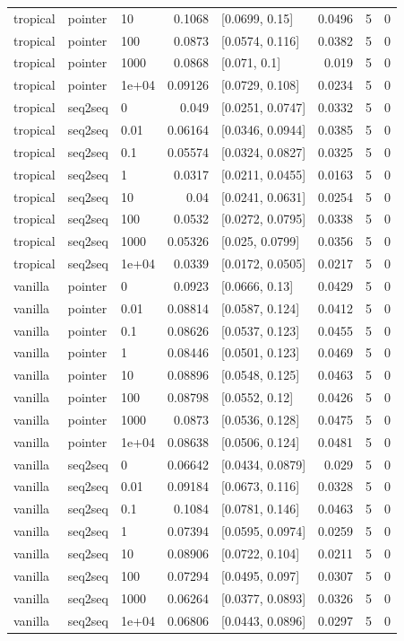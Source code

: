 \documentclass[10pt]{article}
\begin{document}
{\begin{longtable}{lllrlrrr}
tropical & pointer & 10 & 0.1068 & [0.0699, 0.15] & 0.0496 & 5 & 0\\
tropical & pointer & 100 & 0.0873 & [0.0574, 0.116] & 0.0382 & 5 & 0\\
tropical & pointer & 1000 & 0.0868 & [0.071, 0.1] & 0.019 & 5 & 0\\
tropical & pointer & 1e+04 & 0.09126 & [0.0729, 0.108] & 0.0234 & 5 & 0\\
tropical & seq2seq & 0 & 0.049 & [0.0251, 0.0747] & 0.0332 & 5 & 0\\
tropical & seq2seq & 0.01 & 0.06164 & [0.0346, 0.0944] & 0.0385 & 5 & 0\\
tropical & seq2seq & 0.1 & 0.05574 & [0.0324, 0.0827] & 0.0325 & 5 & 0\\
tropical & seq2seq & 1 & 0.0317 & [0.0211, 0.0455] & 0.0163 & 5 & 0\\
tropical & seq2seq & 10 & 0.04 & [0.0241, 0.0631] & 0.0254 & 5 & 0\\
tropical & seq2seq & 100 & 0.0532 & [0.0272, 0.0795] & 0.0338 & 5 & 0\\
tropical & seq2seq & 1000 & 0.05326 & [0.025, 0.0799] & 0.0356 & 5 & 0\\
tropical & seq2seq & 1e+04 & 0.0339 & [0.0172, 0.0505] & 0.0217 & 5 & 0\\
vanilla & pointer & 0 & 0.0923 & [0.0666, 0.13] & 0.0429 & 5 & 0\\
vanilla & pointer & 0.01 & 0.08814 & [0.0587, 0.124] & 0.0412 & 5 & 0\\
vanilla & pointer & 0.1 & 0.08626 & [0.0537, 0.123] & 0.0455 & 5 & 0\\
vanilla & pointer & 1 & 0.08446 & [0.0501, 0.123] & 0.0469 & 5 & 0\\
vanilla & pointer & 10 & 0.08896 & [0.0548, 0.125] & 0.0463 & 5 & 0\\
vanilla & pointer & 100 & 0.08798 & [0.0552, 0.12] & 0.0426 & 5 & 0\\
vanilla & pointer & 1000 & 0.0873 & [0.0536, 0.128] & 0.0475 & 5 & 0\\
vanilla & pointer & 1e+04 & 0.08638 & [0.0506, 0.124] & 0.0481 & 5 & 0\\
vanilla & seq2seq & 0 & 0.06642 & [0.0434, 0.0879] & 0.029 & 5 & 0\\
vanilla & seq2seq & 0.01 & 0.09184 & [0.0673, 0.116] & 0.0328 & 5 & 0\\
vanilla & seq2seq & 0.1 & 0.1084 & [0.0781, 0.146] & 0.0463 & 5 & 0\\
vanilla & seq2seq & 1 & 0.07394 & [0.0595, 0.0974] & 0.0259 & 5 & 0\\
vanilla & seq2seq & 10 & 0.08906 & [0.0722, 0.104] & 0.0211 & 5 & 0\\
vanilla & seq2seq & 100 & 0.07294 & [0.0495, 0.097] & 0.0307 & 5 & 0\\
vanilla & seq2seq & 1000 & 0.06264 & [0.0377, 0.0893] & 0.0326 & 5 & 0\\
vanilla & seq2seq & 1e+04 & 0.06806 & [0.0443, 0.0896] & 0.0297 & 5 & 0\\
\bottomrule
\end{longtable}
}
\end{document}
